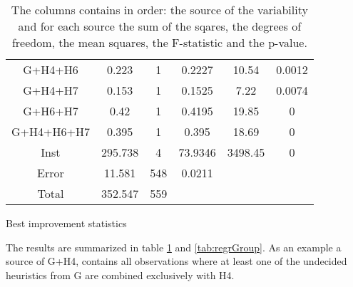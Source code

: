 \documentclass[../main.tex]{subfiles}
\begin{document}
\begin{table}
\begin{adjustbox}{width=\columnwidth,center}
\begin{subtable}{.85\columnwidth}
\begin{tabular}{cccccc}
            G+H4+H6     & 0.223     & 1 & 0.2227    & 10.54 & 0.0012\\
            G+H4+H7     & 0.153     & 1 & 0.1525    & 7.22  & 0.0074\\
            G+H6+H7     & 0.42      & 1 & 0.4195    & 19.85 & 0     \\
            G+H4+H6+H7  & 0.395     & 1 & 0.395     & 18.69 & 0     \\
            Inst        & 295.738   & 4 & 73.9346   &3498.45& 0     \\
            Error       & 11.581    &548& 0.0211    &       &       \\
            Total       & 352.547   &559&           &       &       \\
            \hline
            \end{tabular}
        \caption{Best improvement statistics}
            \label{tab:anovaBestGroup}
        \end{subtable}
    \end{adjustbox}
    \label{tab:anovaGroup}
    \caption*{The columns contains in order: the source of the variability and for each source the sum of the sqares, the degrees of freedom, the mean squares, the F-statistic and the p-value.}
\end{table}

The results are summarized in table \ref{tab:anovaGroup} and \cref{tab:regrGroup}. 
As an example a source of G+H4, contains all observations where at least one of the undecided heuristics from G are combined exclusively with H4.
\end{document}

